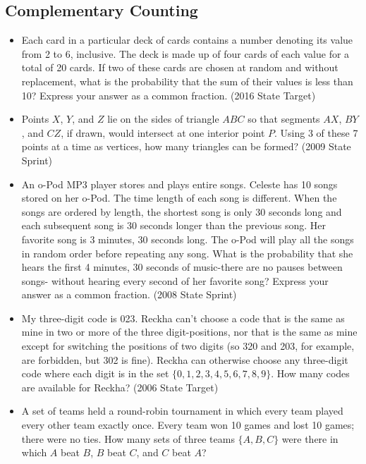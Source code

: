\documentclass{article}
\begin{document}
\subsection{Complementary Counting}



\begin{itemize}

\item Each card in a  particular deck of cards contains a number denoting its value from 2 to 6, inclusive. The deck is made up of four cards of each value for a total of 20 cards. If two of these cards are chosen at random and without replacement, what is the probability that the sum of their values is less than 10? Express your answer as a common fraction. (2016 State Target)

\item Points $X$, $Y$, and $Z$ lie on the sides of triangle $ABC$ so that segments $AX$, $BY$, and $CZ$, if drawn, would intersect at one interior point $P$. Using 3 of these 7 points at a time as vertices, how many triangles can be formed? (2009 State Sprint)

\item An o-Pod MP3 player stores and plays entire songs. Celeste has 10 songs stored on her o-Pod. The time length of each song is different. When the songs are ordered by length, the shortest song is only 30 seconds long and each subsequent song is 30 seconds longer than the previous song. Her favorite song is 3 minutes, 30 seconds long. The o-Pod will play all the songs in random order before repeating any song. What is the probability that she hears the first 4 minutes, 30 seconds of music-there are no pauses between songs- without hearing every second of her favorite song? Express your answer as a common fraction. (2008 State Sprint)

\item My three-digit code is 023. Reckha can't choose a code that is the same as mine in two or more of the three digit-positions, nor that is the same as mine except for switching the positions of two digits (so 320 and 203, for example, are forbidden, but 302 is fine). Reckha can otherwise choose any three-digit code where each digit is in the set $\{0, 1, 2, 3, 4, 5, 6, 7, 8, 9\}$. How many codes are available for Reckha? (2006 State Target)

\item A set of teams held a round-robin tournament in which every team played every other team exactly once. Every team won 10 games and lost 10 games; there were no ties. How many sets of three teams $\{ A, B, C\}$ were there in which $A$ beat $B$, $B$ beat $C$, and $C$ beat $A$?


\end{itemize}
\end{document}
